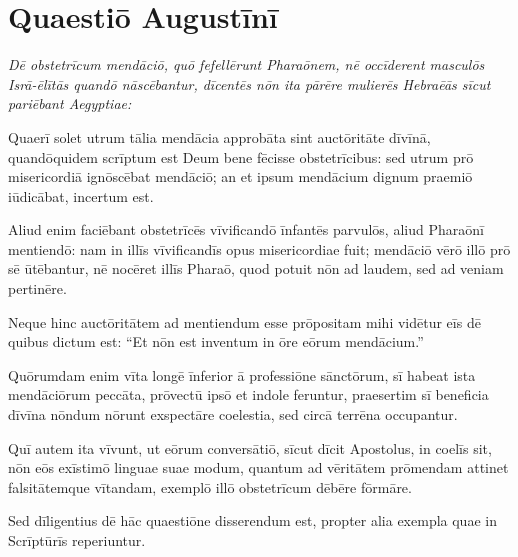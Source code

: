 \section{Quaestiō Augustīnī}

{\it Dē obstetrīcum mendāciō, quō fefellērunt Pharaōnem, nē
occīderent masculōs Isrā-ēlītās quandō nāscēbantur, dīcentēs
nōn ita pārēre mulierēs Hebraēās sīcut pariēbant Aegyptiae:}

Quaerī solet utrum tālia mendācia approbāta sint
auctōritāte dīvīnā, quandōquidem scrīptum est Deum
bene fēcisse obstetrīcibus: sed utrum prō misericordiā
ignōscēbat mendāciō; an et ipsum mendācium dignum
praemiō iūdicābat, incertum est.

Aliud enim faciēbant obstetrīcēs vīvificandō
īnfantēs parvulōs, aliud Pharaōnī mentiendō: nam
in illīs vīvificandīs opus misericordiae fuit; mendāciō
vērō illō prō sē ūtēbantur, nē nocēret illīs
Pharaō, quod potuit nōn ad laudem, sed ad veniam pertinēre.

Neque hinc auctōritātem ad mentiendum esse prōpositam
mihi vidētur eīs dē quibus dictum est: ``Et nōn est
inventum in ōre eōrum mendācium.''

Quōrumdam enim vīta longē
īnferior ā professiōne sānctōrum, sī habeat ista
mendāciōrum peccāta, prōvectū ipsō et indole feruntur,
praesertim sī beneficia dīvīna nōndum nōrunt exspectāre
coelestia, sed circā terrēna occupantur.

Quī autem ita vīvunt, ut eōrum conversātiō,
sīcut dīcit Apostolus,
in coelīs sit, nōn eōs exīstimō linguae suae modum,
quantum ad vēritātem prōmendam attinet falsitātemque vītandam,
exemplō illō obstetrīcum dēbēre fōrmāre.

Sed dīligentius dē hāc quaestiōne disserendum est,
propter alia exempla quae in Scrīptūrīs reperiuntur.

